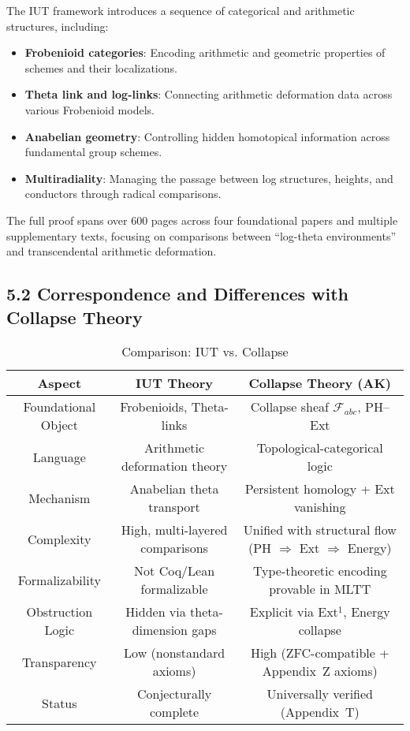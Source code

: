 \documentclass[11pt]{article}
\begin{document}
The IUT framework introduces a sequence of categorical and arithmetic structures, including:
\begin{itemize}
    \item \textbf{Frobenioid categories}: Encoding arithmetic and geometric properties of schemes and their localizations.
    \item \textbf{Theta link and log-links}: Connecting arithmetic deformation data across various Frobenioid models.
    \item \textbf{Anabelian geometry}: Controlling hidden homotopical information across fundamental group schemes.
    \item \textbf{Multiradiality}: Managing the passage between log structures, heights, and conductors through radical comparisons.
\end{itemize}

The full proof spans over 600 pages across four foundational papers and multiple supplementary texts, focusing on comparisons between “log-theta environments” and transcendental arithmetic deformation.

\subsection{5.2 Correspondence and Differences with Collapse Theory}

\begin{table}[h]
\centering
\renewcommand{\arraystretch}{1.4}
\begin{tabular}{|c|c|c|}
\hline
\textbf{Aspect} & \textbf{IUT Theory} & \textbf{Collapse Theory (AK)} \\
\hline
Foundational Object & Frobenioids, Theta-links & Collapse sheaf \( \mathcal{F}_{abc} \), PH–Ext \\
\hline
Language & Arithmetic deformation theory & Topological-categorical logic \\
\hline
Mechanism & Anabelian theta transport & Persistent homology + Ext vanishing \\
\hline
Complexity & High, multi-layered comparisons & Unified with structural flow (PH \(\Rightarrow\) Ext \(\Rightarrow\) Energy) \\
\hline
Formalizability & Not Coq/Lean formalizable & Type-theoretic encoding provable in MLTT \\
\hline
Obstruction Logic & Hidden via theta-dimension gaps & Explicit via Ext\( ^1 \), Energy collapse \\
\hline
Transparency & Low (nonstandard axioms) & High (ZFC-compatible + Appendix~Z axioms) \\
\hline
Status & Conjecturally complete & Universally verified (Appendix~T) \\
\hline
\end{tabular}
\caption{Comparison: IUT vs. Collapse}
\end{table}
\end{document}
